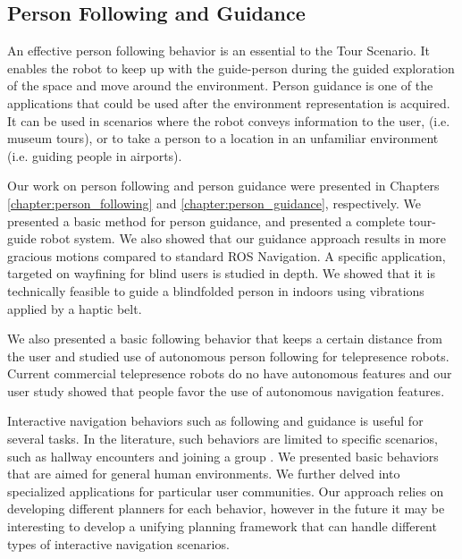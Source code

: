 
\subsection{Person Following and Guidance}

An effective person following behavior is an essential to the Tour Scenario. It enables the robot to keep up with the guide-person during the guided exploration of the space and move around the environment. Person guidance is one of the applications that could be used after the environment representation is acquired. It can be used in scenarios where the robot conveys information to the user, (i.e. museum tours), or to take a person to a location in an unfamiliar environment (i.e. guiding people in airports).

Our work on person following and person guidance were presented in Chapters \ref{chapter:person_following} and \ref{chapter:person_guidance}, respectively. We presented a basic method for person guidance, and presented a complete tour-guide robot system. We also showed that our guidance approach results in more gracious motions compared to standard ROS Navigation. A specific application, targeted on wayfining for blind users is studied in depth. We showed that it is technically feasible to guide a blindfolded person in indoors using vibrations applied by a haptic belt.

We also presented a basic following behavior that keeps a certain distance from the user and studied use of autonomous person following for telepresence robots. Current commercial telepresence robots do no have autonomous features and our user study showed that people favor the use of autonomous navigation features.

Interactive navigation behaviors such as following and guidance is useful for several tasks. In the literature, such behaviors are limited to specific scenarios, such as hallway encounters \cite{pacchierotti2005human} and joining a group \cite{althaus2004navigation}. We presented basic behaviors that are aimed for general human environments. We further delved into specialized applications for particular user communities. Our approach relies on developing different planners for each behavior, however in the future it may be interesting to develop a unifying planning framework that can handle different types of interactive navigation scenarios.

